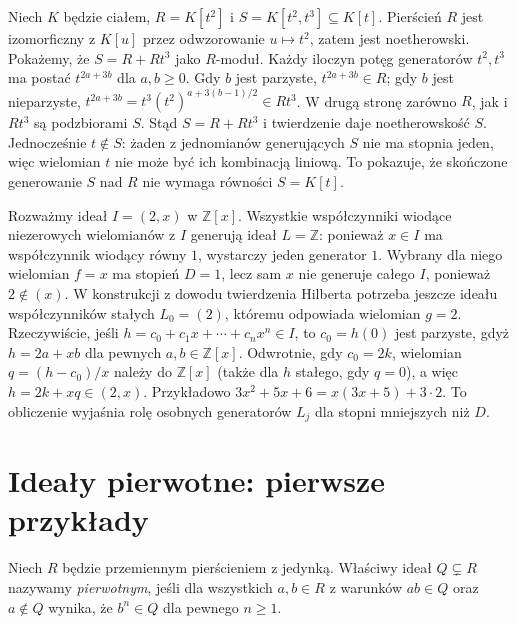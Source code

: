 \begin{przyklad}
\label{aa:prz:noether-cusp-algebra}
Niech $K$ będzie ciałem, $R=K[t^2]$ i
$S=K[t^2,t^3]\subseteq K[t]$. Pierścień $R$
jest izomorficzny z $K[u]$ przez odwzorowanie
$u\mapsto t^2$, zatem jest noetherowski.
Pokażemy, że $S=R+Rt^3$ jako $R$-moduł.
Każdy iloczyn potęg generatorów $t^2,t^3$ ma postać
$t^{2a+3b}$ dla $a,b\ge0$. Gdy $b$ jest parzyste,
$t^{2a+3b}\in R$; gdy $b$ jest nieparzyste,
$t^{2a+3b}=t^3(t^2)^{a+3(b-1)/2}\in Rt^3$.
W drugą stronę zarówno $R$, jak i $Rt^3$ są
podzbiorami $S$. Stąd $S=R+Rt^3$ i twierdzenie
daje noetherowskość $S$.
Jednocześnie $t\notin S$: żaden z jednomianów
generujących $S$ nie ma stopnia jeden, więc
wielomian $t$ nie może być ich kombinacją liniową.
To pokazuje, że skończone generowanie $S$ nad $R$
nie wymaga równości $S=K[t]$.
\end{przyklad}

\begin{przyklad}
\label{aa:prz:noether-leading-coefficients-example}
Rozważmy ideał $I=(2,x)$ w $\mathbb Z[x]$.
Wszystkie współczynniki wiodące niezerowych
wielomianów z $I$ generują ideał $L=\mathbb Z$:
ponieważ $x\in I$ ma współczynnik wiodący równy $1$,
wystarczy jeden generator $1$.
Wybrany dla niego wielomian $f=x$ ma stopień $D=1$,
lecz sam $x$ nie generuje całego $I$, ponieważ
$2\notin(x)$.
W konstrukcji z dowodu twierdzenia Hilberta potrzeba
jeszcze ideału współczynników stałych $L_0=(2)$,
któremu odpowiada wielomian $g=2$.
Rzeczywiście, jeśli $h=c_0+c_1x+\cdots+c_nx^n\in I$,
to $c_0=h(0)$ jest parzyste, gdyż $h=2a+xb$
dla pewnych $a,b\in\mathbb Z[x]$. Odwrotnie,
gdy $c_0=2k$, wielomian $q=(h-c_0)/x$ należy
do $\mathbb Z[x]$ (także dla $h$ stałego, gdy $q=0$),
a więc $h=2k+xq\in(2,x)$.
Przykładowo $3x^2+5x+6=x(3x+5)+3\cdot2$.
To obliczenie wyjaśnia rolę osobnych generatorów
$L_j$ dla stopni mniejszych niż $D$.
\end{przyklad}

\section{Ideały pierwotne: pierwsze przykłady}
\begin{definicja}
\label{aa:def:primary-ideal}
Niech $R$ będzie przemiennym pierścieniem z jedynką.
Właściwy ideał $Q\subsetneq R$ nazywamy
\emph{pierwotnym}, jeśli dla wszystkich $a,b\in R$
z warunków $ab\in Q$ oraz $a\notin Q$ wynika,
że $b^n\in Q$ dla pewnego $n\ge1$.
\end{definicja}


